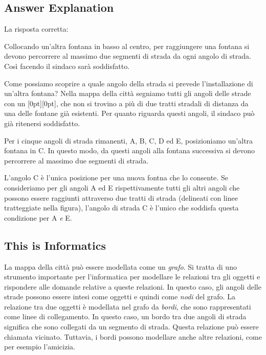 \documentclass[a4paper,11pt]{report}
\newcommand{\taskGraphicsFolder}{..}
\begin{document}
\endgroup

\subsection*{Answer Explanation}

La risposta corretta:

{\centering%
\par}

Collocando un’altra fontana in basso al centro, per raggiungere una fontana si devono percorrere al massimo due segmenti di strada da ogni angolo di strada.
Così facendo il sindaco sarà soddisfatto.

Come possiamo scoprire a quale angolo della strada si prevede l’installazione di un’altra fontana?
Nella mappa della città segniamo tutti gli angoli delle strade con un \raisebox{-0.5ex}[0pt][0pt]{},
che non si trovino a più di due tratti stradali di distanza da una delle fontane già esistenti.
Per quanto riguarda questi angoli, il sindaco può già ritenersi soddisfatto.

{\centering%
\par}

Per i cinque angoli di strada rimanenti, A, B, C, D ed E, posizioniamo un’altra fontana in C. In questo modo, da questi angoli alla fontana successiva si devono percorrere al massimo due segmenti di strada.

L’angolo C è l’unica posizione per una nuova fontna che lo consente.
Se consideriamo per gli angoli A ed E rispettivamente tutti gli altri angoli che possono essere raggiunti attraverso due tratti di strada (delineati con linee tratteggiate nella figura),
l’angolo di strada C è l’unico che soddisfa questa condizione per A \emph{e} E.


\subsection*{This is Informatics}

La mappa della città può essere modellata come un \emph{grafo}.
Si tratta di uno strumento importante per l’informatica per modellare le relazioni tra gli oggetti e rispondere alle domande relative a queste relazioni.
In questo caso, gli angoli delle strade possono essere intesi come oggetti e quindi come \emph{nodi} del grafo.
La relazione tra due oggetti è modellata nel grafo da \emph{bordi}, che sono rappresentati come linee di collegamento. In questo caso, un bordo tra due angoli di strada significa che sono collegati da un segmento di strada. Questa relazione può essere chiamata vicinato. Tuttavia, i bordi possono modellare anche altre relazioni, come per esempio l’amicizia.
\end{document}
